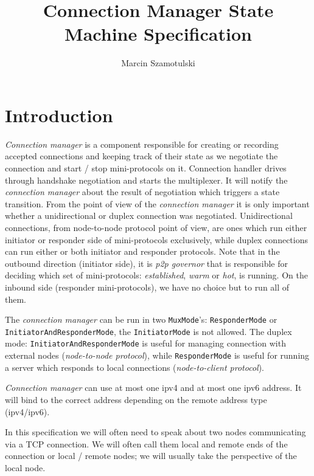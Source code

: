 \documentclass{article}
\title{Connection Manager State Machine Specification}
\author{Marcin Szamotulski}
\def\TCP{\textsf{TCP}}
\def\ipvfour{\textsf{ipv4}}
\def\ipvsix{\textsf{ipv6}}
\def\warm{\textit{warm}}
\def\hot{\textit{hot}}
\def\established{\textit{established}}
\def\ptopgov{\textit{p2p governor}}
\def\connmngr{\textit{connection manager}}
\def\Connmngr{\textit{Connection manager}}
\begin{document}
\maketitle
\tableofcontents

\section{Introduction}
\Connmngr{} is a component responsible for creating or recording
accepted connections and keeping track of their state as we negotiate the
connection and start / stop mini-protocols on it.  Connection handler drives
through handshake negotiation and starts the multiplexer. It will notify the
\connmngr{} about the result of negotiation which triggers a state
transition.  From the point of view of the \connmngr{} it is only
important whether a unidirectional or duplex connection was negotiated.
Unidirectional connections, from node-to-node protocol point of view, are ones
which run either initiator or responder side of mini-protocols exclusively,
while duplex connections can run either or both initiator and responder
protocols.  Note that in the outbound direction (initiator side), it is
\ptopgov{} that is responsible for deciding which set of mini-protocols:
\established{}, \warm{} or \hot{}, is running.  On the inbound side (responder
mini-protocols), we have no choice but to run all of them.

The \connmngr{} can be run in two \texttt{MuxMode}'s: \texttt{ResponderMode} or
\texttt{InitiatorAndResponderMode}, the \texttt{InitiatorMode} is not allowed.
The duplex mode: \texttt{InitiatorAndResponderMode} is useful for managing
connection with external nodes (\textit{node-to-node protocol}), while
\texttt{ResponderMode} is useful for running a server which responds to local
connections (\textit{node-to-client protocol}).

\Connmngr{} can use at most one \ipvfour{} and at most one \ipvsix{}
address.  It will bind to the correct address depending on the remote address
type (\ipvfour{}/\ipvsix{}).

In this specification we will often need to speak about two nodes communicating
via a \TCP{} connection.  We will often call them local and remote ends of the
connection or local \slash{} remote nodes; we will usually take the
perspective of the local node.
\end{document}

